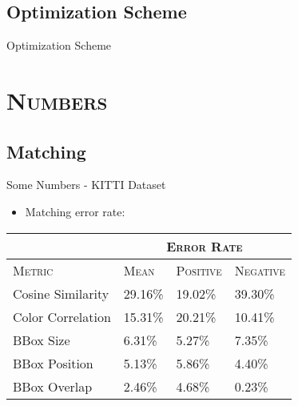 \subsection{Optimization Scheme}
\begin{frame}{Optimization Scheme}
\begin{algorithm}[H]
	\vspace{5px}

	\vspace{10px}
\end{algorithm}
\end{frame}


\section{\scshape Numbers}
\subsection{Matching}
\begin{frame}{Some Numbers - KITTI Dataset}
\begin{itemize}
	\item Matching error rate:
\end{itemize}
\begin{center}
	\begin{table}
	 \begin{tabular}{l|lll}
	   \hline
	   & \multicolumn{3}{c}{\textsc{Error Rate}}\\\hline
	   \textsc{Metric} & \textsc{Mean} & \textsc{Positive} & \textsc{Negative}\\ \hline\hline
	   Cosine Similarity & 29.16\% & 19.02\% & 39.30\%\\
	   Color Correlation & 15.31\% & 20.21\% & 10.41\%\\
	   BBox Size & 6.31\% & 5.27\% & 7.35\%\\
	   BBox Position & 5.13\% & 5.86\% & 4.40\%\\
	   BBox Overlap & 2.46\% & 4.68\% & 0.23\%\\\hline
	   \hline
	 \end{tabular}
	\end{table}
\end{center}
\end{frame}


